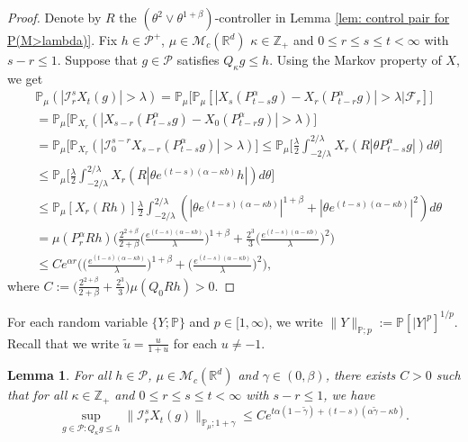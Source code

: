 \documentclass[12pt,a4paper]{amsart}
\theoremstyle{plain}
\newtheorem{lem}[thm]{Lemma}
\theoremstyle{definition}
\numberwithin{equation}{section}
\begin{document}
\begin{proof}
  Denote by $R$ the $(\theta^2\vee\theta^{1+\beta})$-controller in Lemma \ref{lem: control pair for P(M>lambda)}.
  Fix $h \in \mathcal P^+$, $\mu \in \mathcal M_c(\mathbb R^d)$ $\kappa \in \mathbb Z_+ $ and $0\leq r\leq s\leq t < \infty$ with $s-r \leq 1$.
  Suppose that $g\in \mathcal P$ satisfies $Q_\kappa g \leq h$.
  Using the Markov property of $X$, we get
  \begin{align}
   & \mathbb P_{\mu}(|\mathcal I_r^sX_t(g)|>\lambda)
      = \mathbb P_\mu \Big[\mathbb P_\mu [| X_{s}(P_{t-s}^\alpha g) -  X_{r}(P_{t-r}^\alpha g)|> \lambda | \mathscr F_r ]\Big] \\
     & = \mathbb P_\mu \big[\mathbb P_{X_r}(| X_{s-r}(P_{t-s}^\alpha g) -  X_{0}(P_{t-r}^\alpha g)|> \lambda)\big] \\
    & = \mathbb P_\mu \big[\mathbb P_{X_r}(|\mathcal I_0^{s-r} X_{s-r}( P_{t-s}^\alpha g) |> \lambda)\big]
      \leq \mathbb P_\mu \Big[ \frac{\lambda}{2}\int_{-2/\lambda}^{2/\lambda}X_r(R|\theta P^\alpha_{t-s}g|) d\theta \Big] \\
     & \leq \mathbb P_\mu \Big[ \frac{\lambda}{2}\int_{-2/\lambda}^{2/\lambda}X_r(R|\theta e^{(t-s)(\alpha- \kappa b)}h|) d\theta \Big] \\
     & \leq \mathbb P_\mu [X_r(Rh) ]
\frac{\lambda}{2}\int_{-2/\lambda}^{2/\lambda}(|\theta e^{(t-s)(\alpha- \kappa b)}|^{1+\beta} + |\theta e^{(t-s)(\alpha- \kappa b)}|^{2})d\theta
     \\ & =  \mu(P_r^\alpha Rh)
\Big(  \frac{2^{2+\beta}}{2+\beta}\Big(\frac{e^{(t-s)(\alpha- \kappa b)}}{\lambda}\Big)^{1+\beta} + \frac{2^{3}}{3}\Big(\frac{e^{(t-s)(\alpha- \kappa b)}}{\lambda}\Big)^2\Big)
    \\ & \leq C e^{\alpha r} \Big(\Big( \frac{e^{(t-s)(\alpha - \kappa b)}}{\lambda}\Big)^{1+\beta} + \Big( \frac{e^{(t-s)(\alpha - \kappa b)}}{\lambda}\Big)^{2} \Big),
  \end{align}
where $C := \Big(\frac{2^{2+\beta}}{2+\beta} + \frac{2^{3}}{3} \Big) \mu(Q_0Rh)>0$.
\end{proof}

For each random variable $\{Y; \mathbb P\}$ and $p \in [1,\infty)$, we write $ \|Y\|_{\mathbb P;p} := \mathbb P[|Y|^p]^{1/p}$.
Recall that we write $\tilde u = \frac{u}{1+u}$ for each $u\neq -1$.
\begin{lem}
  \label{lem: control of mgtrs}
  For all $h \in \mathcal P$, $\mu \in \mathcal M_c(\mathbb R^d)$ and $\gamma\in (0, \beta)$, there exists $C > 0$ such that for all $\kappa \in \mathbb Z_+$ and $0\leq r \leq s\leq t<\infty$ with $s-r \leq 1$, we have
  \[
     \sup_{g \in \mathcal P: Q_\kappa g \leq h} \|\mathcal I_r^s X_t(g) \|_{\mathbb P_\mu;1+\gamma}
    \leq C e^{t\alpha (1- \tilde \gamma)+(t-s) (\alpha \tilde \gamma - \kappa b)}.
  \]
\end{lem}
\end{document}
